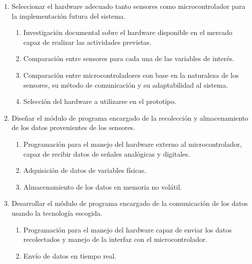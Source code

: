 \documentclass[12pt,letterpaper]{article}
\begin{document}
\begin{enumerate}[1.]
	\item Seleccionar el hardware adecuado tanto sensores como microcontrolador para la implementación futura del sistema.


	      \begin{enumerate}

			\item Investigación documental sobre el hardware disponible en el mercado capaz de realizar las actividades previstas.

			\item Comparación entre sensores para cada una de las variables de interés.

			\item Comparación entre microcontroladores con base en la naturaleza de los sensores, su método de comunicación y su adaptabilidad al sistema.
			
		 	\item Selección del hardware a utilizarse en el prototipo.

	      \end{enumerate}

	\item Diseñar el módulo de programa encargado de la recolección y almacenamiento de los datos provenientes de los sensores.


	      \begin{enumerate}
			
			\item Programación para el manejo del hardware externo al microcontrolador, capaz de recibir datos de señales analógicas y digitales.
			\item Adquisición de datos de variables físicas.
			\item Almacenamiento de los datos en memoria no volátil.

	      \end{enumerate}



	\item Desarrollar el módulo de programa encargado de la comunicación de los datos usando la tecnología escogida.


	      \begin{enumerate}

			\item Programación para el manejo del hardware capaz de enviar los datos recolectados y manejo de la interfaz con el microcontrolador.
			\item Envío de datos en tiempo real.


\end{enumerate}
\end{enumerate}
\end{document}
